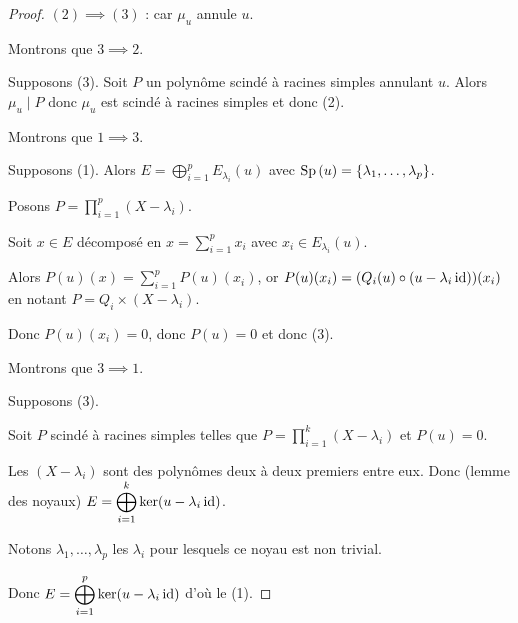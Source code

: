 \begin{proof}
    $(2) \implies (3)$ : car $\mu_u$ annule $u$.

    \lvspace Montrons que $3 \implies 2$.
    
    Supposons (3). Soit $P$ un polynôme scindé à racines simples annulant $u$. Alors $\mu_u \mid P$ donc 
    $\mu_u$ est scindé à racines simples et donc (2).

    \lvspace Montrons que $1 \implies 3$. 
    
    Supposons (1). 
    Alors $E = \displaystyle \bigoplus_{i = 1 }^{ p } E_{\lambda_i}(u)$ avec $\operatorname{Sp} \,(u) = \{\lambda_1, \ldots, \lambda_p\}$.

    Posons $P = \displaystyle \prod_{i = 1 }^{ p } (X - \lambda_i)$.

    Soit $x \in E$ décomposé en $x = \displaystyle \sum_{i = 1 }^{ p } x_i$ avec $x_i \in E_{\lambda_i}(u)$.

    Alors $P(u)(x) = \displaystyle \sum_{i = 1 }^{ p } P(u)(x_i)$, or $P(u)(x_i) = (Q_i(u) \circ (u - \lambda_i \operatorname{id}))(x_i)$
    en notant $P = Q_i \times (X - \lambda_i)$.

    Donc $P(u)(x_i) = 0$, donc $P(u) = 0$ et donc (3).

    \lvspace Montrons que $3 \implies 1$. 
    
    Supposons (3). 

    Soit $P$ scindé à racines simples telles que $P = \displaystyle \prod_{i = 1 }^{ k } (X - \lambda_i)$
    et $P(u) = 0$.

    Les $(X - \lambda_i)$ sont des polynômes deux à deux premiers entre eux. Donc 
    (lemme des noyaux) $E = \displaystyle \bigoplus_{i = 1 }^{ k } \ker (u - \lambda_i \operatorname{id})$.

    Notons $\lambda_1, \dots, \lambda_p$ les $\lambda_i$ pour lesquels ce noyau est non trivial.

    Donc $E = \displaystyle \bigoplus_{i = 1 }^{ p } \ker (u - \lambda_i \operatorname{id}) $ d'où le (1).
\end{proof}

